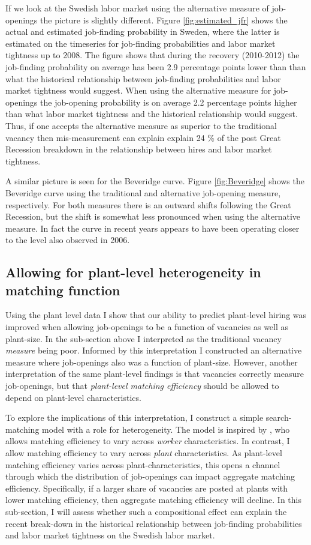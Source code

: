If we look at the Swedish labor market using the alternative measure of job-openings the picture is slightly different. Figure \ref{fig:estimated_jfr} shows the actual and estimated job-finding probability in Sweden, where the latter is estimated on the timeseries for job-finding probabilities and labor market tightness up to 2008. The figure shows that during the recovery (2010-2012) the job-finding probability on average has been 2.9 percentage points lower than than what the historical relationship between job-finding probabilities and labor market tightness would suggest. When using the alternative measure for job-openings the job-opening probability is on average 2.2 percentage points higher than what labor market tightness and the historical relationship would suggest. Thus, if one accepts the alternative measure as superior to the traditional vacancy then mis-measurement can explain explain 24 \% of the post Great Recession breakdown in the relationship between hires and labor market tightness. 

A similar picture is seen for the Beveridge curve. Figure \ref{fig:Beveridge} shows the Beveridge curve using the traditional and alternative job-opening measure, respectively. For both measures there is an outward shifts following the Great Recession, but the shift is somewhat less pronounced when using the alternative measure. In fact the curve in recent years appears to have been operating closer to the level also observed in 2006. 

\subsection{Allowing for plant-level heterogeneity in matching function}

Using the plant level data I show that our ability to predict plant-level hiring was improved when allowing job-openings to be a function of vacancies as well as plant-size. In the sub-section above I interpreted as the traditional vacancy \emph{measure} being poor. Informed by this interpretation I constructed an alternative measure where job-openings also was a function of plant-size. However, another interpretation of the same plant-level findings is that vacancies correctly measure job-openings, but that \emph{plant-level matching efficiency} should be allowed to depend on plant-level characteristics. 

To explore the implications of this interpretation, I construct a simple search-matching model with a role for heterogeneity. The model is inspired by \cite{Kroft2016}, who allows matching efficiency to vary across \emph{worker} characteristics. In contrast, I allow matching efficiency to vary across \emph{plant} characteristics. As plant-level matching efficiency varies across plant-characteristics, this opens a channel through which the distribution of job-openings can impact aggregate matching efficiency. Specifically, if a larger share of vacancies are posted at plants with lower matching efficiency, then aggregate matching efficiency will decline. In this sub-section, I will assess whether such a compositional effect can explain the recent break-down in the historical relationship between job-finding probabilities and labor market tightness on the Swedish labor market.

